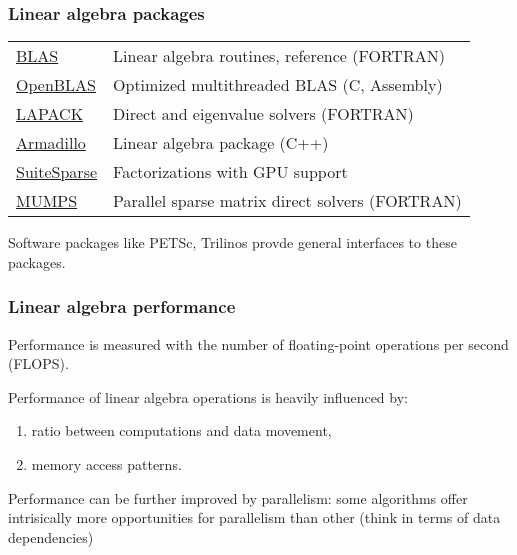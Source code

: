 \begin{frame}
  \frametitle{Linear algebra packages}

\begin{tabular}{l|l}
\href{http://www.netlib.org/blas/}{BLAS} & Linear algebra routines, reference (FORTRAN)\\
\href{http://www.openblas.net/}{OpenBLAS} & Optimized multithreaded BLAS (C, Assembly)\\
\href{http://www.netlib.org/lapack/}{LAPACK} & Direct and eigenvalue solvers (FORTRAN)\\
\href{http://arma.sourceforge.net/}{Armadillo} &  Linear algebra package (C++)\\
\href{http://faculty.cse.tamu.edu/davis/suitesparse.html}{SuiteSparse} &  Factorizations with GPU support\\
\href{http://mumps.enseeiht.fr/}{MUMPS} & Parallel sparse matrix direct solvers (FORTRAN)\\
\end{tabular}

\bigskip
Software packages like PETSc, Trilinos provde general interfaces to these packages.

\end{frame}


\begin{frame}
  \frametitle{Linear algebra performance}

Performance is measured with the number of floating-point operations per second (FLOPS).

\medskip
Performance of linear algebra operations is heavily influenced by:
\begin{enumerate}
\item ratio between computations and data movement, 
\item memory access patterns.
\end{enumerate}

\medskip
Performance can be further improved by parallelism: some algorithms offer intrisically more opportunities for parallelism than other (think in terms of data dependencies)

\end{frame}



